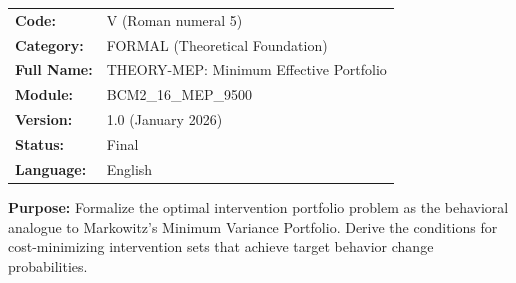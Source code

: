 %
%


\begin{tcolorbox}[colback=gray!5!white, colframe=gray!75!black,
    title=Appendix Header: V THEORY-MEP]

\begin{tabular}{@{}ll@{}}
\textbf{Code:} & V (Roman numeral 5) \\
\textbf{Category:} & FORMAL (Theoretical Foundation) \\
\textbf{Full Name:} & THEORY-MEP: Minimum Effective Portfolio \\
\textbf{Module:} & BCM2\_16\_MEP\_9500 \\
\textbf{Version:} & 1.0 (January 2026) \\
\textbf{Status:} & Final \\
\textbf{Language:} & English \\
\end{tabular}

\vspace{0.5em}
\textbf{Purpose:} Formalize the optimal intervention portfolio problem as the
behavioral analogue to Markowitz's Minimum Variance Portfolio. Derive the
conditions for cost-minimizing intervention sets that achieve target behavior
change probabilities.

\end{tcolorbox}


